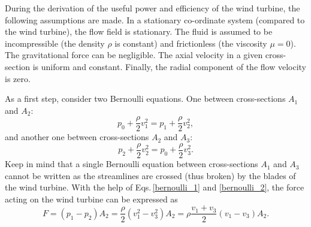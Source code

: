 During the derivation of the useful power and efficiency of the wind turbine, the following assumptions are made. In a stationary co-ordinate system (compared to the wind turbine), the flow field is stationary. The fluid is assumed to be incompressible (the density $\rho$ is constant) and frictionless (the viscosity $\mu=0$). The gravitational force can be negligible. The axial velocity in a given cross-section is uniform and constant. Finally, the radial component of the flow velocity is zero.

As a first step, consider two Bernoulli equations. One between cross-sections $A_1$ and $A_2$:
%
\begin{equation} \label{bernoulli_1}
p_0 + \frac{\rho}{2} v_1^2 = p_1 + \frac{\rho}{2} v_2^2,
\end{equation}
%
and another one between cross-sections $A_2$ and $A_3$:
%
\begin{equation} \label{bernoulli_2}
p_2 + \frac{\rho}{2} v_2^2 = p_0 + \frac{\rho}{2} v_3^2.
\end{equation}
%
Keep in mind that a single Bernoulli equation between cross-sections $A_1$ and $A_3$ cannot be written as the streamlines are crossed (thus broken) by the blades of the wind turbine. With the help of Eqs.\,\eqref{bernoulli_1} and \eqref{bernoulli_2}, the force acting on the wind turbine can be expressed as
%
\begin{equation} \label{wind_turbine_force_from_bernoulli}
F = (p_1-p_2) A_2 = \frac{\rho}{2} (v_1^2-v_3^2) A_2 = \rho \frac{v_1+v_3}{2} (v_1-v_3) A_2.
\end{equation}

